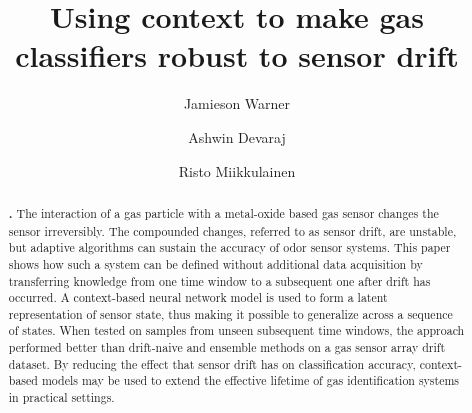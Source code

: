 \documentclass[onecolumn,pre,floats,aps,amsmath,amssymb,superscriptaddress]{revtex4-1}
\begin{document}
\title{Using context to make gas classifiers robust to sensor drift}

\author{Jamieson Warner}
\author{Ashwin Devaraj}
\author{Risto Miikkulainen}

\begin{abstract}
\textbf{\abstractname.} The interaction of a gas particle with a metal-oxide based gas sensor changes the sensor irreversibly. The compounded changes, referred to as sensor drift, are unstable, but adaptive algorithms can sustain the accuracy of odor sensor systems. This paper shows how such a system can be defined without additional data acquisition by transferring knowledge from one time window to a subsequent one after drift has occurred. A context-based neural network model is used to form a latent representation of sensor state, thus making it possible to generalize across a sequence of states. When tested on samples from unseen subsequent time windows, the approach performed better than drift-naive and ensemble methods on a gas sensor array drift dataset. By reducing the effect that sensor drift has on classification accuracy, context-based models may be used to extend the effective lifetime of gas identification systems in practical settings.
\end{abstract}

\maketitle
\end{document}
